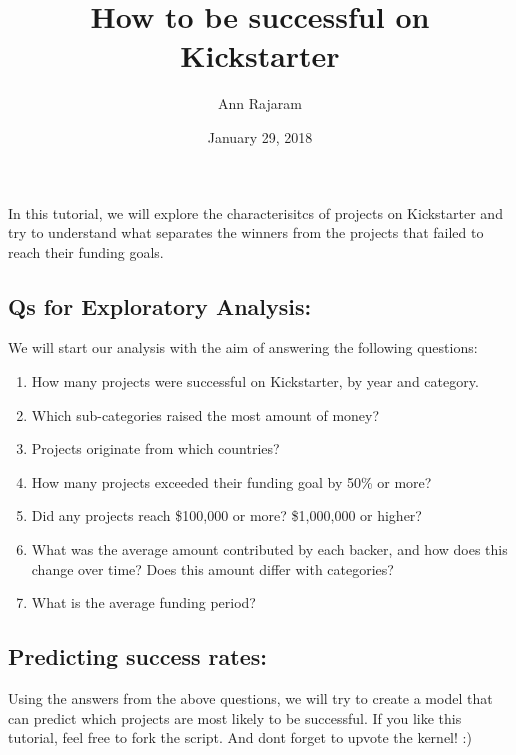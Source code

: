 \documentclass[]{article}
\title{How to be successful on Kickstarter}
\author{Ann Rajaram}
\date{January 29, 2018}
\providecommand{\tightlist}{%
  \setlength{\itemsep}{0pt}\setlength{\parskip}{0pt}}
\begin{document}
\maketitle

\subsection{}\label{section}

In this tutorial, we will explore the characterisitcs of projects on
Kickstarter and try to understand what separates the winners from the
projects that failed to reach their funding goals.

\subsection{\texorpdfstring{{Qs for Exploratory
Analysis:}}{Qs for Exploratory Analysis:}}\label{qs-for-exploratory-analysis}

We will start our analysis with the aim of answering the following
questions:

\begin{enumerate}
\def\labelenumi{\arabic{enumi}.}
\tightlist
\item
  How many projects were successful on Kickstarter, by year and
  category.
\item
  Which sub-categories raised the most amount of money?
\item
  Projects originate from which countries?
\item
  How many projects exceeded their funding goal by 50\% or more?
\item
  Did any projects reach \$100,000 or more? \$1,000,000 or higher?
\item
  What was the average amount contributed by each backer, and how does
  this change over time? Does this amount differ with categories?
\item
  What is the average funding period?
\end{enumerate}

\subsection{\texorpdfstring{{Predicting success
rates:}}{Predicting success rates:}}\label{predicting-success-rates}

Using the answers from the above questions, we will try to create a
model that can predict which projects are most likely to be successful.
If you like this tutorial, feel free to fork the script. And dont forget
to upvote the kernel! :)
\end{document}
